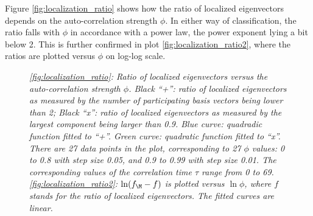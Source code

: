 Figure \ref{fig:localization_ratio} shows how the ratio of localized
eigenvectors depends on the auto-correlation strength $\phi$. In
either way of classification, the ratio falls with $\phi$ in
accordance with a power law, the power exponent lying a bit below 2.
This is further confirmed in plot \ref{fig:localization_ratio2}, where
the ratios are plotted versus $\phi$ on log-log scale.
\begin{figure}[htb!]
  \centering
  \caption{\small \it \ref{fig:localization_ratio}: Ratio of localized
    eigenvectors versus the auto-correlation strength $\phi$. Black
    ``+'': ratio of localized eigenvectors as measured by the number
    of participating basis vectors being lower than 2; Black ``x'':
    ratio of localized eigenvectors as measured by the largest
    component being larger than 0.9. Blue curve: quadradic function
    fitted to ``+''. Green curve: quadratic function fitted to
    ``x''. There are 27 data points in the plot, corresponding to 27
    $\phi$ values: 0 to 0.8 with step size 0.05, and 0.9 to 0.99 with
    step size 0.01. The corresponding values of the correlation time
    $\tau$ range from 0 to 69. \ref{fig:localization_ratio2}: $\ln
    (f_\M - f)$ is plotted versus $\ln \phi$, where $f$ stands for the
    ratio of localized eigenvectors. The fitted curves are linear.}
\end{figure}


